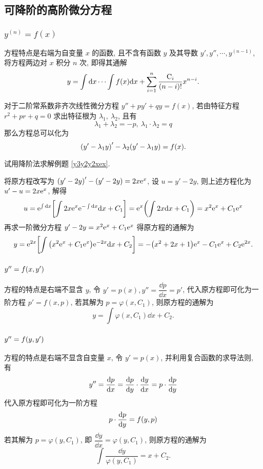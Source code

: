 \subsection{可降阶的高阶微分方程}

\subsubsection{$y^{(n)}=f(x)$}

方程特点是右端为自变量 $x$ 的函数, 且不含有函数 $y$ 及其导数 $y',y'',\cdots,y^{(n-1)}$, 将方程两边对 $x$ 积分 $n$ 次, 即得其通解
$$y=\int\dd x\cdots\int f(x)\dd x+\sum_{i=1}^{n}\dfrac{\mathrm{C}_i}{(n-i)!}x^{n-i}.$$

\begin{theorem}
    对于二阶常系数非齐次线性微分方程 $y''+py'+qy=f(x)$, 若由特征方程 $r^2+pr+q=0$ 求出特征根为 $\lambda_1,~\lambda_2$, 且有
    $$\lambda_1+\lambda_2=-p,~\lambda_1\cdot\lambda_2=q$$
    那么方程总可以化为 $$\qty(y'-\lambda_1y)'-\lambda_2\qty(y'-\lambda_1y)=f(x).$$
\end{theorem}

\begin{example}
    试用降阶法求解例题 \ref{y3y2y2xex}.
\end{example}
\begin{solution}
    将原方程改写为 $\qty(y'-2y)'-(y'-2y)=2x\mathrm{e} ^x$, 设 $u=y'-2y$, 则上述方程化为 $u'-u=2x\mathrm{e} ^x$, 解得
    $$u=\mathrm{e} ^{\int\dd x}\qty[\int 2x\mathrm{e} ^x\mathrm{e} ^{-\int\dd x}\dd x+C_1]=\mathrm{e} ^x\qty(\int 2x\dd x+C_1)=x^2\mathrm{e} ^x+C_1\mathrm{e} ^x$$
    再求一阶微分方程 $y'-2y=x^2\mathrm{e} ^x+C_1\mathrm{e} ^x$ 得原方程的通解为
    $$y=\mathrm{e} ^{2x}\qty[\int\qty(x^2\mathrm{e} ^x+C_1\mathrm{e} ^x)\mathrm{e} ^{-2x}\dd x+C_2]=-\qty(x^2+2x+1)\mathrm{e} ^x-C_1\mathrm{e} ^x+C_2\mathrm{e} ^{2x}.$$
\end{solution}

\subsubsection{$y''=f\qty(x,y')$}

方程的特点是右端不显含 $y$, 令 $y'=p(x), y''=\dfrac{\dd p}{\dd x}=p'$, 代入原方程即可化为一阶方程 $p'=f(x,p)$, 若其解为 $p=\varphi(x,C_1)$, 则原方程的通解为 $$y=\int\varphi(x,C_1)\dd x+C_2.$$

\subsubsection{$y''=f\qty(y,y')$}

方程的特点是右端不显含自变量 $x$, 令 $y'=p(x)$, 并利用复合函数的求导法则, 有
$$y''=\dv{p}{x}=\dv{p}{y}\cdot\dv{y}{x}=p\cdot\dv{p}{y}$$
代入原方程即可化为一阶方程 $$p\cdot \dv{p}{y}=f(y,p)$$
若其解为 $p=\varphi(y,C_1)$, 即 $\dfrac{\dd y}{\dd x}=\varphi(y,C_1)$, 则原方程的通解为
$$\int \dfrac{\dd y}{\varphi(y,C_1)}=x+C_2.$$

